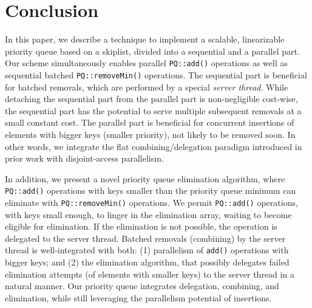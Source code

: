\section{Conclusion}
\label{Sec-Conclusion}

In this paper, we describe a technique to implement a scalable, linearizable priority queue based on a skiplist, divided into a sequential and a parallel part. Our scheme simultaneously enables parallel \texttt{PQ::add()} operations as well as sequential batched \texttt{PQ::removeMin()} operations. The sequential part is beneficial for batched removals, which are performed by a special \emph{server thread}. While detaching the sequential part from the parallel part is non-negligible cost-wise, the sequential part has the potential to serve multiple subsequent removals at a small constant cost. 
The parallel part is beneficial for concurrent insertions of elements with bigger keys (smaller priority), not likely to be removed soon. 
In other words, we integrate the flat combining/delegation paradigm introduced in prior work with disjoint-access parallelism.

In addition, we present a novel priority queue elimination algorithm, where \texttt{PQ::add()} operations with keys smaller than the priority queue minimum can eliminate with \texttt{PQ::removeMin()} operations. We permit \texttt{PQ::add()} operations, with keys small enough, to linger in the elimination array, waiting to become eligible for elimination. If the elimination is not possible, the operation is delegated to the server thread. Batched removals (combining) by the server thread is well-integrated with both: (1) parallelism of \texttt{add()} operations with bigger keys; and (2) the elimination algorithm, that possibly delegates failed elimination attempts (of elements with smaller keys) to the server thread in a natural manner. Our priority queue integrates delegation, combining, and elimination, while still leveraging the parallelism potential of insertions.
